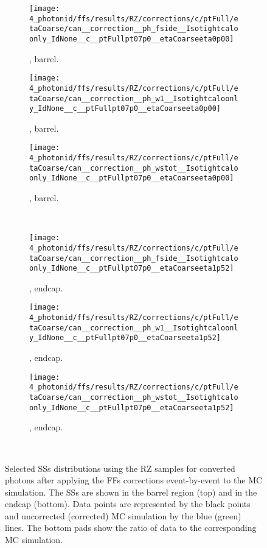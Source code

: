 \begin{figure}[ht!]
    \centering
    \begin{subfigure}[h]{0.32\linewidth}
        \centering
        \texttt{[image: 4\_photonid/ffs/results/RZ/corrections/c/ptFull/etaCoarse/can\_\_correction\_\_ph\_fside\_\_Isotightcaloonly\_IdNone\_\_c\_\_ptFullpt07p0\_\_etaCoarseeta0p00]}
        \caption{\fside, barrel.}
    \end{subfigure}
    \hfill
    \begin{subfigure}[h]{0.32\linewidth}
        \centering
        \texttt{[image: 4\_photonid/ffs/results/RZ/corrections/c/ptFull/etaCoarse/can\_\_correction\_\_ph\_w1\_\_Isotightcaloonly\_IdNone\_\_c\_\_ptFullpt07p0\_\_etaCoarseeta0p00]}
        \caption{\wone, barrel.}
    \end{subfigure}
    \hfill
    \begin{subfigure}[h]{0.32\linewidth}
        \centering
        \texttt{[image: 4\_photonid/ffs/results/RZ/corrections/c/ptFull/etaCoarse/can\_\_correction\_\_ph\_wstot\_\_Isotightcaloonly\_IdNone\_\_c\_\_ptFullpt07p0\_\_etaCoarseeta0p00]}
        \caption{\wstot, barrel.}
    \end{subfigure}\\
    \begin{subfigure}[h]{0.32\linewidth}
        \centering
        \texttt{[image: 4\_photonid/ffs/results/RZ/corrections/c/ptFull/etaCoarse/can\_\_correction\_\_ph\_fside\_\_Isotightcaloonly\_IdNone\_\_c\_\_ptFullpt07p0\_\_etaCoarseeta1p52]}
        \caption{\fside, endcap.}
    \end{subfigure}
    \hfill
    \begin{subfigure}[h]{0.32\linewidth}
        \centering
        \texttt{[image: 4\_photonid/ffs/results/RZ/corrections/c/ptFull/etaCoarse/can\_\_correction\_\_ph\_w1\_\_Isotightcaloonly\_IdNone\_\_c\_\_ptFullpt07p0\_\_etaCoarseeta1p52]}
        \caption{\wone, endcap.}
    \end{subfigure}
    \hfill
    \begin{subfigure}[h]{0.32\linewidth}
        \centering
        \texttt{[image: 4\_photonid/ffs/results/RZ/corrections/c/ptFull/etaCoarse/can\_\_correction\_\_ph\_wstot\_\_Isotightcaloonly\_IdNone\_\_c\_\_ptFullpt07p0\_\_etaCoarseeta1p52]}
        \caption{\wstot, endcap.}
    \end{subfigure}\\
    \caption{Selected \acp{SS} distributions using the \ac{RZ} samples for converted photons after applying the \acp{FF} corrections event-by-event to the \ac{MC} simulation. The \acp{SS} are shown in the barrel region (top) and in the endcap (bottom). Data points are represented by the black points and uncorrected (corrected) \ac{MC} simulation by the blue (green) lines. The bottom pads show the ratio of data to the corresponding \ac{MC} simulation.}
    \label{fig:ss_corrections:ffs:results:ss_rz}
\end{figure}

